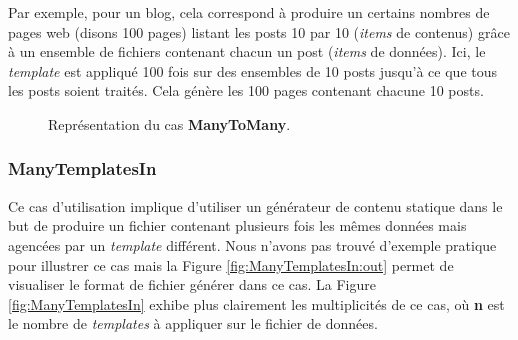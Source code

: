 			\begin{exmpl}
				\label{exmpl:ManyToMany}
				 Par exemple, pour un blog, cela correspond à produire un certains nombres de pages web (disons 100 pages) listant les posts 10 par 10 (\textit{items} de contenus) grâce à un ensemble de fichiers contenant chacun un post (\textit{items} de données). Ici, le \textit{template} est appliqué 100 fois sur des ensembles de 10 posts jusqu'à ce que tous les posts soient traités. Cela génère les 100 pages contenant chacune 10 posts.  
			\end{exmpl}
			
			\begin{figure}[!]
				\begin{center}
					\caption{Représentation du cas \textbf{ManyToMany}.}
					\label{fig:ManyToMany}
				\end{center}
			\end{figure}
		
		
		\subsubsection*{ManyTemplatesIn}
			Ce cas d'utilisation implique  d'utiliser un générateur de contenu statique dans le but de produire un fichier contenant plusieurs fois les mêmes données mais agencées par un \textit{template} différent. Nous n'avons pas trouvé d'exemple pratique pour illustrer ce cas mais la Figure \ref{fig:ManyTemplatesIn:out} permet de visualiser le format de fichier générer dans ce cas. La Figure \ref{fig:ManyTemplatesIn} exhibe plus clairement les multiplicités de ce cas, où \textbf{n} est le nombre de \textit{templates} à appliquer sur le fichier de données.
			
